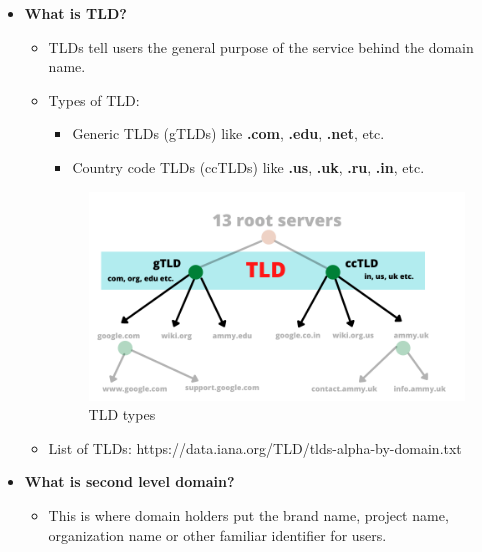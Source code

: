 \begin{flushleft}
\begin{itemize}
			
		
		\newpage
		\item \textbf{What is TLD?}
		\bigskip
		\begin{itemize}
			\item TLDs tell users the general purpose of the service behind the domain name. 
			\bigskip
			\item Types of TLD:
			\begin{itemize}
				\item Generic TLDs (gTLDs) like \textbf{.com}, \textbf{.edu}, \textbf{.net}, etc.
				\item Country code TLDs (ccTLDs) like \textbf{.us}, \textbf{.uk}, \textbf{.ru}, \textbf{.in}, etc. 
			\end{itemize}  
		
			\begin{figure}[h!]
				\centering
				\includegraphics[scale=.5]{content/chapter3/images/page2.png}
				\caption{TLD types}
				\label{fig:tld}
			\end{figure}		
			\bigskip
			\item List of TLDs: https://data.iana.org/TLD/tlds-alpha-by-domain.txt
		\end{itemize}

		\newpage
		\item \textbf{What is second level domain?}
		\bigskip
		
		\begin{itemize}
			\item This is where domain holders put the brand name, project name, organization name or other familiar identifier for users.
			

\end{itemize}
\end{itemize}
\end{flushleft}
